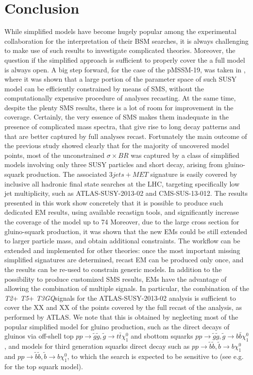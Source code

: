 \documentclass[preprint,number,sort&compress,twocolumn,3p]{elsstyarticle}
\newcommand{\TGQ}{ \textit{T3GQ}}
\newcommand{\Ttwo}{ \textit{T2}}
\newcommand{\Tfive}{ \textit{T5}}
\begin{document}
\section{Conclusion}\label{sec:conclusion}
While simplified models have become hugely popular among the experimental collaboration for the interpretation of their BSM searches, it is always challenging to make use of such results to investigate complicated theories. Moreover, the question if the simplified approach is sufficient to properly cover the a full model is always open. A big step forward, for the case of the pMSSM-19, was taken in \cite{ddd} , where it was shown that a large portion of the parameter space of such SUSY model can be efficiently constrained by means of SMS, without the computationally expensive procedure of analyses recasting. At the same time,  despite the plenty SMS results, there is a lot of room for improvement in the coverage. Certainly, the very essence of SMS makes them inadequate in the presence of  complicated mass spectra, that give rise to long decay patterns and that are better captured by full analyses recast. 
Fortunately the main outcome of the previous study showed clearly that for the majority of uncovered model points, most of the unconstrained $\sigma \times BR$ was captured by a class of simplified models involving only three SUSY particles and short decay, arising from gluino-squark production. The associated $3jets + MET$ signature is easily covered by inclusive all hadronic final state searches at the LHC, targeting specifically low jet multiplicity, such as ATLAS-SUSY-2013-02 and CMS-SUS-13-012. The results presented in this work show concretely that  it is possible to produce such dedicated EM results, using available recastign tools, and significantly increase the coverage of the model up to 74%
Moreover, due to the large cross section for gluino-squark production, it was shown that the new EMs could be still extended to larger particle mass, and obtain additional constraints. 
The workflow can be extended and implemented for other theories: once the most important missing simplified signatures are determined, recast EM can be produced only once, and the results can be re-used to constrain generic models. In addition to the possibility to produce customized SMS results, EMs have the advantage of allowing the combination of multiple signals. In particular, the combination of the \Ttwo+\Tfive+\TGQ signals for the ATLAS-SUSY-2013-02 analysis is sufficient to cover the XX and XX of the points covered by the full recast of the analysis, as performed by ATLAS. We note that this is obtained by neglecting most of the popular simplified model for gluino production, such as the direct decays of gluinos via off-shell top $pp \rightarrow \tilde g \tilde g, \tilde g \rightarrow t \bar t \chi _1 ^0$ and sbottom squarks $pp \rightarrow \tilde g \tilde g, \tilde g \rightarrow b \bar b \chi _1 ^0$, and models for third generation squarks direct decay such as $pp \rightarrow \tilde b \tilde b, \tilde b \rightarrow b \chi _1 ^0$ and $pp \rightarrow \tilde b \tilde b, \tilde b \rightarrow b \chi _1 ^0$, to which the search is expected to be sensitive to (see e.g. \cite{Kraml:2016eti} for the top squark model). 
\end{document}
